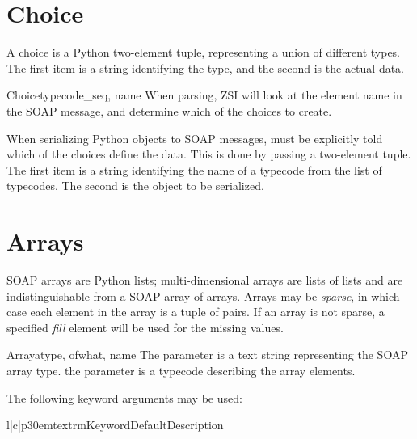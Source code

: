 \section{Choice}

A choice is a Python two-element  tuple, representing
a union of different types.
The first item is a string identifying the type, and the second is the
actual data.

\begin{classdesc}{Choice}{typecode_seq, name}
When parsing, ZSI will look at the element name in the SOAP message, and
determine which of the choices to create.

When serializing Python objects to SOAP messages, \ZSI{} must be
explicitly told which of the choices define the data.
This is done by passing a two-element tuple.
The first item is a string identifying the name of a typecode
from the  list of typecodes.
The second is the object to be serialized.
\end{classdesc}

\section{Arrays}

SOAP arrays are Python lists; multi-dimensional arrays are
lists of lists and are indistinguishable from a SOAP array of arrays.
Arrays may be \emph{sparse}, in which case each element in the
array is a tuple of  pairs.
If an array is not sparse, a specified \emph{fill} element will be
used for the missing values.


\begin{classdesc}{Array}{atype, ofwhat, name}
The  parameter is a text string representing the SOAP array type.
the  parameter is a typecode describing the array elements.
\end{classdesc}

The following keyword arguments may be used:

\begin{tableiii}{l|c|p{30em}}{textrm}{Keyword}{Default}{Description}
\end{tableiii}

